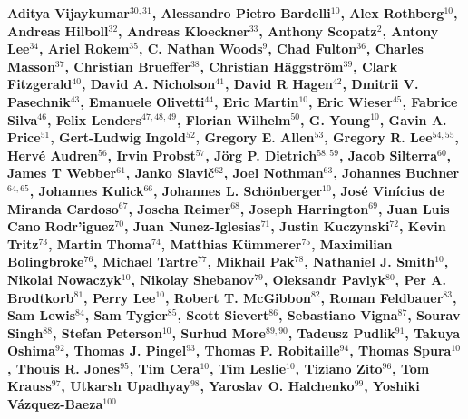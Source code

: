 
{\bf
Aditya Vijaykumar$^{30,31}$, Alessandro Pietro Bardelli$^{10}$, Alex Rothberg$^{10}$, Andreas Hilboll$^{32}$, Andreas Kloeckner$^{33}$, Anthony Scopatz$^{2}$, Antony Lee$^{34}$, Ariel Rokem$^{35}$, C. Nathan Woods$^{9}$, Chad Fulton$^{36}$, Charles Masson$^{37}$, Christian Brueffer$^{38}$, Christian H\"aggstr\"om$^{39}$, Clark Fitzgerald$^{40}$, David A. Nicholson$^{41}$, David R Hagen$^{42}$, Dmitrii V. Pasechnik$^{43}$, Emanuele Olivetti$^{44}$, Eric Martin$^{10}$, Eric Wieser$^{45}$, Fabrice Silva$^{46}$, Felix Lenders$^{47,48,49}$, Florian Wilhelm$^{50}$, G. Young$^{10}$, Gavin A. Price$^{51}$, Gert-Ludwig Ingold$^{52}$, Gregory E. Allen$^{53}$, Gregory R. Lee$^{54,55}$, Herv\'e Audren$^{56}$, Irvin Probst$^{57}$, J\"org P. Dietrich$^{58,59}$, Jacob Silterra$^{60}$, James T Webber$^{61}$, Janko Slavi\v{c}$^{62}$, Joel Nothman$^{63}$, Johannes Buchner$^{64,65}$, Johannes Kulick$^{66}$, Johannes L. Sch\"{o}nberger$^{10}$, Jos\'e Vin\'icius de Miranda Cardoso$^{67}$, Joscha Reimer$^{68}$, Joseph Harrington$^{69}$, Juan Luis Cano Rodr'iguez$^{70}$, Juan Nunez-Iglesias$^{71}$, Justin Kuczynski$^{72}$, Kevin Tritz$^{73}$, Martin Thoma$^{74}$, Matthias K\"ummerer$^{75}$, Maximilian Bolingbroke$^{76}$, Michael Tartre$^{77}$, Mikhail Pak$^{78}$, Nathaniel J. Smith$^{10}$, Nikolai Nowaczyk$^{10}$, Nikolay Shebanov$^{79}$, Oleksandr Pavlyk$^{80}$, Per A. Brodtkorb$^{81}$, Perry Lee$^{10}$, Robert T. McGibbon$^{82}$, Roman Feldbauer$^{83}$, Sam Lewis$^{84}$, Sam Tygier$^{85}$, Scott Sievert$^{86}$, Sebastiano Vigna$^{87}$, Sourav Singh$^{88}$, Stefan Peterson$^{10}$, Surhud More$^{89,90}$, Tadeusz Pudlik$^{91}$, Takuya Oshima$^{92}$, Thomas J. Pingel$^{93}$, Thomas P. Robitaille$^{94}$, Thomas Spura$^{10}$, Thouis R. Jones$^{95}$, Tim Cera$^{10}$, Tim Leslie$^{10}$, Tiziano Zito$^{96}$, Tom Krauss$^{97}$, Utkarsh Upadhyay$^{98}$, Yaroslav O. Halchenko$^{99}$, Yoshiki V\'azquez-Baeza$^{100}$
}
\newline
\hfill \break

